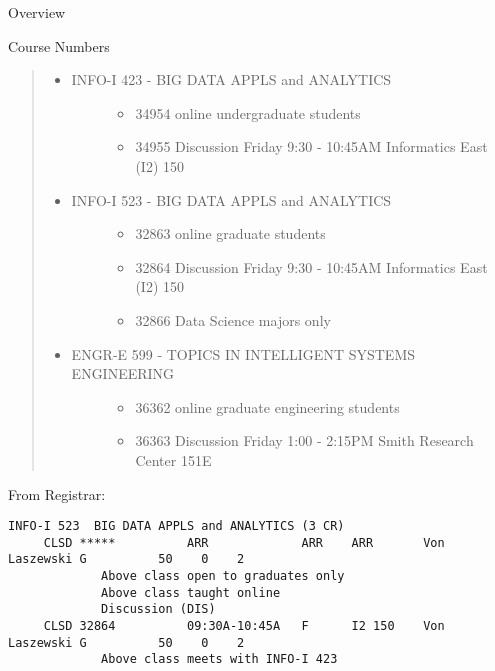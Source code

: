 \begin{edXchapter}{Overview}
\begin{edXsection}{Course Numbers}
\begin{quote}
\begin{itemize}
\item
  \begin{description}
  \item[INFO-I 423 - BIG DATA APPLS and ANALYTICS]
  \begin{itemize}
  \itemsep1pt\parskip0pt
  \item
    34954 online undergraduate students
  \item
    34955 Discussion Friday 9:30 - 10:45AM Informatics East (I2) 150
  \end{itemize}
  \end{description}
\item
  \begin{description}
  \item[INFO-I 523 - BIG DATA APPLS and ANALYTICS]
  \begin{itemize}
  \itemsep1pt\parskip0pt
  \item
    32863 online graduate students
  \item
    32864 Discussion Friday 9:30 - 10:45AM Informatics East (I2) 150
  \item
    32866 Data Science majors only
  \end{itemize}
  \end{description}
\item
  \begin{description}
  \item[ENGR-E 599 - TOPICS IN INTELLIGENT SYSTEMS ENGINEERING]
  \begin{itemize}
  \itemsep1pt\parskip0pt
  \item
    36362 online graduate engineering students
  \item
    36363 Discussion Friday 1:00 - 2:15PM Smith Research Center 151E
  \end{itemize}
  \end{description}
\end{itemize}
\end{quote}

From Registrar:

\begin{verbatim}
INFO-I 523  BIG DATA APPLS and ANALYTICS (3 CR)
     CLSD *****          ARR             ARR    ARR       Von Laszewski G          50    0    2
             Above class open to graduates only
             Above class taught online
             Discussion (DIS)
     CLSD 32864          09:30A-10:45A   F      I2 150    Von Laszewski G          50    0    2
             Above class meets with INFO-I 423


\end{verbatim}
\end{edXsection}
\end{edXchapter}
